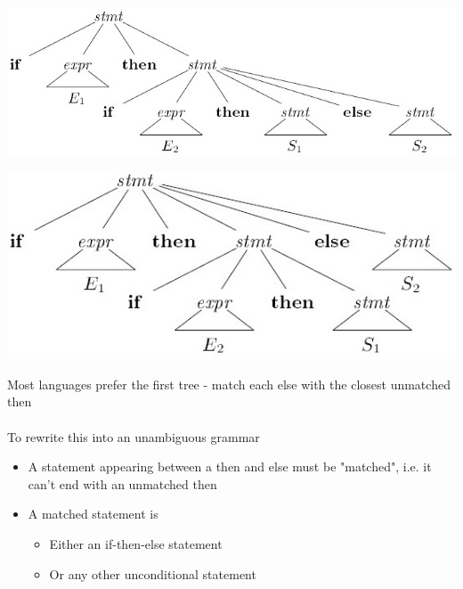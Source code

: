 \documentclass{article}[18pt]
\begin{document}
\begin{center}
	\includegraphics[scale=0.7]{else1}
\end{center}
\begin{center}
	\includegraphics[scale=0.7]{else2}
\end{center}
Most languages prefer the first tree - match each else with the closest unmatched then\\
\\
To rewrite this into an unambiguous grammar
\begin{itemize}
	\item A statement appearing between a then and else must be "matched", i.e. it can't end with an unmatched then
	\item A matched statement is
	\begin{itemize}
		\item Either an if-then-else statement
		\item Or any other unconditional statement
	\end{itemize}
\end{itemize}
\end{document}
